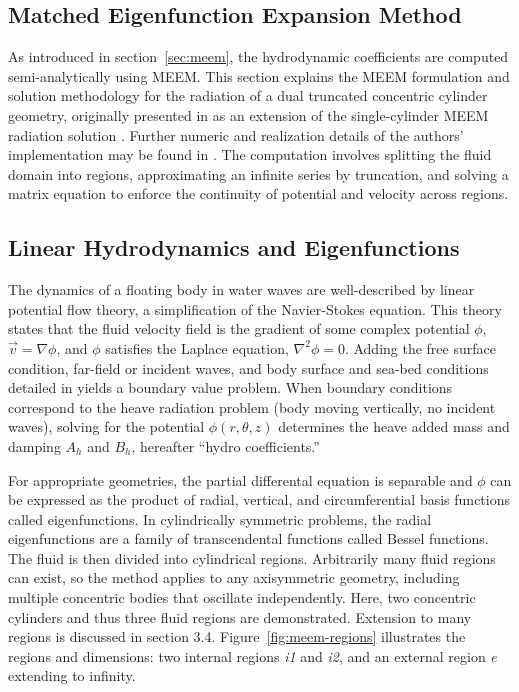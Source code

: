 \begin{appendices}
\section{Matched Eigenfunction Expansion Method}
\label{sec:MEEM_details}
As introduced in section~\ref{sec:meem}, the hydrodynamic coefficients are computed semi-analytically using MEEM.
This section explains the MEEM formulation and solution methodology for the radiation of a dual truncated concentric cylinder geometry, originally presented in \cite{mavrakos_hydrodynamic_2004,chau_inertia_2010,chau_inertia_2012} as an extension of the single-cylinder MEEM radiation solution \cite{yeung_added_1981}.
Further numeric and realization details of the authors' implementation may be found in \cite{bimali_numerics_2026,best_openflash_2026,mccabe_open-source_2024}.
The computation involves splitting the fluid domain into regions, approximating an infinite series by truncation, and solving a matrix equation to enforce the continuity of potential and velocity across regions. 

\subsection{Linear Hydrodynamics and Eigenfunctions}
The dynamics of a floating body in water waves are well-described by linear potential flow theory, a simplification of the Navier-Stokes equation.
This theory states that the fluid velocity field  is the gradient of some complex potential $\phi$, $\vec{v}=\nabla\phi$, and $\phi$ satisfies the Laplace equation, $\nabla^2\phi=0$.
Adding the free surface condition, far-field or incident waves, and body surface and sea-bed conditions detailed in \cite{chatjigeorgiou_analytical_2018} yields a boundary value problem.
When boundary conditions correspond to the heave radiation problem (body moving vertically, no incident waves), solving for the potential $\phi(r,\theta,z)$ determines the heave added mass and damping $A_h$ and $B_h$, hereafter ``hydro coefficients.”

For appropriate geometries, the partial differental equation is separable and $\phi$ can be expressed as the product of radial, vertical, and circumferential basis functions called eigenfunctions.
In cylindrically symmetric problems, the radial eigenfunctions are a family of transcendental functions called Bessel functions.
The fluid is then divided into cylindrical regions.
Arbitrarily many fluid regions can exist, so the method applies to any axisymmetric geometry, including multiple concentric bodies that oscillate independently.
Here, two concentric cylinders and thus three fluid regions are demonstrated.
Extension to many regions is discussed in section 3.4.
Figure~\ref{fig:meem-regions} illustrates the regions and dimensions: two internal regions \textit{i1} and \textit{i2}, and an external region \textit{e} extending to infinity.


\end{appendices}
